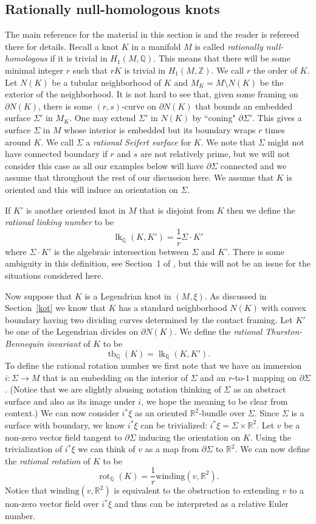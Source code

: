 \documentclass[11pt]{amsart}
\theoremstyle{plain}
\theoremstyle{definition}
\theoremstyle{remark}
\numberwithin{theorem}{section}
\newcommand{\dfn}[1]{{\em #1}}        %
\newcommand{\R}{\mathbb{R}}           %
\newcommand{\Q}{\mathbb{Q}}           %
\newcommand{\Z}{\mathbb{Z}}           %
\DeclareMathOperator\tb{tb}                   %
\DeclareMathOperator\rot{rot}                 %
\DeclareMathOperator\lk{lk}  			%
\begin{document}
\subsection{Rationally null-homologous knots}\label{rational}
The main reference for the material in this section is \cite{BakerEtnyre12} and the reader is refereed there for details. 
Recall a knot $K$ in a manifold $M$ is called \dfn{rationally null-homologous} if it is trivial in $H_1(M,\Q)$. This means that there will be some minimal integer $r$ such that $rK$ is trivial in $H_1(M,\Z)$. We call $r$ the order of $K$. Let $N(K)$ be a tubular neighborhood of $K$ and $M_K=M\setminus N(K)$ be the exterior of the neighborhood. It is not hard to see that, given some framing on $\partial N(K)$, there is some $(r,s)$-curve on $\partial N(K)$ that bounds an embedded surface $\Sigma'$ in $M_K$. One may extend $\Sigma'$ in $N(K)$ by ``coning" $\partial \Sigma'$. This gives a surface $\Sigma$ in $M$ whose interior is embedded but its boundary wraps $r$ times around $K$. We call $\Sigma$ a \dfn{rational Seifert surface} for $K$. 
We note that $\Sigma$ might not have connected boundary if $r$ and $s$ are not relatively prime, but we will not consider this case as all our examples below will have $\partial \Sigma$ connected and we assume that throughout the rest of our discussion here. We assume that $K$ is oriented and this will induce an orientation on $\Sigma$. 

If $K'$ is another oriented knot in $M$ that is disjoint from $K$ then we define the \dfn{rational linking number} to be
\[
\lk_\Q(K,K')=\frac 1r \Sigma\cdot K'
\]
where $\Sigma\cdot K'$ is the algebraic intersection between $\Sigma$ and $K'$. There is some ambiguity in this definition, see Section~1 of \cite{BakerEtnyre12}, but this will not be an issue for the situations considered here. 

Now suppose that $K$ is a Legendrian knot in $(M,\xi)$. As discussed in Section~\ref{kot} we know that $K$ has a standard neighborhood $N(K)$ with convex boundary having two dividing curves determined by the contact framing. Let $K'$ be one of the Legendrian divides on $\partial N(K)$. We define the \dfn{rational Thurston-Bennequin invariant} of $K$ to be 
\[
\tb_\Q(K)=\lk_\Q(K,K').
\]
To define the rational rotation number we first note that we have an immersion $i:\Sigma\to M$ that is an embedding on the interior of $\Sigma$ and an $r$-to-$1$ mapping on $\partial \Sigma$. (Notice that we are slightly abusing notation thinking of $\Sigma$ as an abstract surface and also as its image under $i$, we hope the meaning to be clear from context.) We can now consider $i^*\xi$ as an oriented $\R^2$-bundle over $\Sigma$. Since $\Sigma$ is a surface with boundary, we know $i^*\xi$ can be trivialized: $i^*\xi=\Sigma\times \R^2$. Let $v$ be a non-zero vector field tangent to $\partial \Sigma$ inducing the orientation on $K$. Using the trivialization of $i^*\xi$ we can think of $v$ as a map from $\partial \Sigma$ to $\R^2$. We can now define the \dfn{rational rotation} of $K$ to be
\[
\rot_\Q(K)=\frac 1r \text{winding}(v,\R^2).
\]
Notice that $\text{winding}(v,\R^2)$ is equivalent to the obstruction to extending $v$ to a non-zero vector field over $i^*\xi$ and thus can be interpreted as a relative Euler number. 
\end{document}

